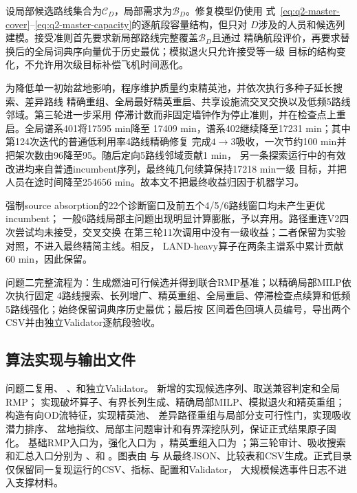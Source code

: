 \documentclass[UTF8,a4paper,zihao=5]{ctexart}
\begin{document}
设局部候选路线集合为$\mathcal C_D$，局部需求为$\mathcal B_D$。修复模型仍使用
式~\eqref{eq:q2-master-cover}--\eqref{eq:q2-master-capacity}的逐航段容量结构，但只对
$D$涉及的人员和候选列建模。接受准则首先要求新局部路线完整覆盖$\mathcal B_D$且通过
精确航段评价，再要求替换后的全局词典序向量优于历史最优；模拟退火只允许接受等一级
目标的结构变化，不允许用次级目标补偿飞机时间恶化。

为降低单一初始盆地影响，程序维护质量约束精英池，并依次执行多种子延长搜索、差异路线
精确重组、全局最好精英重启、共享设施流交叉交换以及低频5路线邻域。第三轮进一步采用
停滞计数而非固定墙钟作为停止准则，并在检查点上重启。全局谱系401将17595 min降至
17409 min，谱系402继续降至17231 min；其中第124次迭代的普通低利用率4路线精确修复
完成$4\to3$吸收，一次节约100 min并把架次数由96降至95。随后定向5路线邻域贡献1 min，
另一条探索运行中的有效改进均来自普通incumbent序列，最终纯几何续算保持17218 min一级
目标，并把人员在途时间降至254656 min。故本文不把最终收益归因于机器学习。

强制source absorption的22个诊断窗口及前五个4/5/6路线窗口均未产生更优incumbent；
一般6路线局部主问题出现明显计算膨胀，予以弃用。路径重连V2四次尝试均未接受，交叉交换
在第三轮11次调用中没有一级收益；二者保留为实验对照，不进入最终精简主线。相反，
LAND-heavy算子在两条主谱系中累计贡献60 min，因此保留。

问题二完整流程为：生成燃油可行候选并得到联合RMP基准；以精确局部MILP依次执行固定
4路线搜索、长列增广、精英重组、全局重启、停滞检查点续算和低频5路线强化；始终保留词典序历史最优；最后按
区间着色回填人员编号，导出两个CSV并由独立Validator逐航段验收。

\subsection{算法实现与输出文件}

问题二复用、
、和独立Validator。
新增的实现候选序列、取送兼容判定和全局RMP；
实现破坏算子、有界长列生成、精确局部MILP、模拟退火和精英重组；
构造有向OD流特征，实现精英池、
差异路径重组与局部分支可行性门，实现吸收潜力排序、
盆地指纹、局部主问题审计和有界深挖队列，保证正式结果原子固化。
基础RMP入口为，强化入口为
，精英重组入口为
；第三轮审计、吸收搜索和汇总入口分别为
、和
。图表由
与
从最终JSON、比较表和CSV生成。正式目录仅保留同一复现运行的CSV、指标、配置和Validator，
大规模候选事件日志不进入支撑材料。
\end{document}
